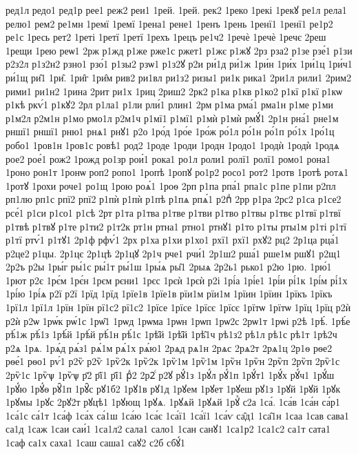 {ред1л
редо1
ред1р
рее1
реж2
реи1
1рей.
1рей.
рек2
1реко
1рекі
1рекꙋ
ре1л
рела1
релю1
рем2
ре1мн
1ремї
1ремї
1рена1
рене1
1ренъ
1рень
1ренї1
1ренї1
ре1р2
ре1с
1ресь
рет2
1реті
1ретї
1ретї
1рехъ
1рецъ
ре1ч2
1речѐ
1речѐ
1речє
2реш
1рещи
1рею
реѡ1
2рж
р1жд
р1же
рже1с
ржет1
р1жє
р1жꙋ
2рз
рза2
р1зе
рзе́1
р1зи
р2з2л
р1з2н2
рзно1
рзо́1
р1зы2
рзѡ1
р1з2ꙋ
р2и
ри́1д
ри́1ж
1ри́н
1ри́х
1ри́1ц
1ри́ч1
ри́1щ
ри̑1
1ри̑.
1ри̑г
1ри̑м
рив2
ри1вл
ри1з2
ризы1
ри1к
рика1
2ри1л
рили1
2рим2
рими1
ри1н2
1рина
2рит
ри1х
1риц
2риш2
2рк2
р1ка
р1кв
р1ко2
р1кї
р1кї
р1кѡ
р1кѣ
ркѵ́1
р1кꙋ2
2рл
р1ла1
р1ли
рли́1
рлин1
2рм
р1ма
рма́1
рма1н
р1ме
р1ми
р1м2л
р2м1н
р1мо
рмо1л
р2м1ч
р1мї1
р1мї1
р1мѝ
р1мѝ
рмꙋ́1
2р1н
рна́1
рне1м
рншї1
рншї1
рню1
рнѧ1
рнꙋ1
р2о
1ро́д
1ро́е
1ро́ж
ро́1л
ро́1н
ро́1п
ро́1х
1ро́1ц
робо1
1ров1н
1ров1с
ровѣ1
род2
1роде
1роди
1родн
1родо1
1родѝ
1родѝ
1родѧ
рое2
рое́1
рож2
1рожд
ро1зр
рои́1
рока1
ро1л
роли1
ролї1
ролї1
ромо1
рона1
1роно
рон1т
1ронѡ
роп2
ропо1
1ропѣ
1ропꙋ
ро1р2
росо1
рот2
1ротв
1ротѣ
ротѧ1
1ротꙋ
1рохи
роче1
ро1щ
1рою
роѧ́1
1роѳ
2рп
р1па
рпа́1
рпа1с
р1пе
р1пи
р2пл
рп1лю
рп1с
рпї2
рпї2
р1пѝ
р1пѝ
р1пѣ
р1пѧ
рпѧ́1
р2пⷣ
2рр
р1ра
2рс2
р1са
р1се2
рсе́1
р1си
р1со1
р1сѣ
2рт
р1та
р1тва
р1тве
р1тви
р1тво
р1твы
р1твє
р1твї
р1твї
р1твѣ
р1твꙋ
р1те
р1ти2
р1т2к
рт1н
ртна1
ртно1
ртнꙋ1
р1то
р1ты
рты1м
р1ті
р1тї
р1тї
ртѵ́1
р1тꙋ1
2р1ф
рфѵ́1
2рх
р1ха
р1хи
р1хо1
рхї1
рхї1
рхꙋ2
рц2
2р1ца
рца́1
р2це2
р1цы.
2р1цє
2р1цѣ
2р1цꙋ
2р1ч
рче1
рчи́1
2р1ш2
рша́1
рше1м
ршꙋ1
р2щ1
2р2ъ
р2ы
1ры́г
ры́1с
ры́1т
ры́1ш
1ры́ѧ
ры̑1
2рыѧ
2р2ь1
рько1
р2ю
1рю.
1рю́1
1рют
р2є
1рє́м
1рє́н
1рєм
рєни1
1рєс
1рєѝ
1рєѝ
р2і
1рі́а
1рі́е1
1рі́и
рі́1к
1рі́м
рі́1х
1рі́ю
1рі́ѧ
р2ї
р2ї
1рїд
1рїд
1рїе1в
1рїе1в
рїи1м
рїи1м
1рїин
1рїин
1рїкъ
1рїкъ
1рї1л
1рї1л
1рїн
1рїн
рї1с2
рї1с2
1рїсе
1рїсе
1рїсє
1рїсє
1рїтѡ
1рїтѡ
1рїц
1рїц
р2ѝ
р2ѝ
р2ѡ
1рѡ́к
рѡ́1с
1рѡ̑1
1рѡд
1рѡма
1рѡн
1рѡп
1рѡ2с
2рѡ1т
1рѡі
р2ѣ
1рѣ́.
1рѣ́е
рѣ́1ж
рѣ́1з
1рѣ́й
1рѣ́й
рѣ́1н
рѣ́1с
1рѣ̑й
1рѣ̑й
1рѣ̑1ч
рѣ1з2
рѣ1л
рѣ1с
рѣ1т
1рѣ2ч
р2ѧ
1рѧ.
1рѧ́д
рѧ́з1
рѧ́1м
рѧ́1х
рѧ́ю1
2рѧд
рѧ1н
2рѧс
2рѧ2т
2рѧ1ц
2р1ѳ
рѳе2
рѳе́1
рѳо1
рѵ́1
р2ѷ
р2ѷ
1рѷ2к
1рѷ2к
1рѷ1м
1рѷ1м
1рѷн
1рѷн
2рѷп
2рѷп
2рѷ1с
2рѷ1с
1рѷѱ
1рѷѱ
р҃2
р҃ї1
р҃ї1
рⷣ2
2р2ⷭ
р2ꙋ
рꙋ́1з
1рꙋ́л
рꙋ́1п
1рꙋ́т1
1рꙋ́х
рꙋ́ч1
1рꙋ́ш
1рꙋ́ю
1рꙋ́ѳ
рꙋ̑1п
1рꙋ̑с
рꙋ1б2
1рꙋ1в
рꙋ1д
1рꙋем
1рꙋет
1рꙋеш
рꙋ1з
1рꙋй
1рꙋй
1рꙋк
1рꙋмы
1рꙋс
2рꙋ2т
рꙋцѣ1
1рꙋющ
1рꙋѧ.
1рꙋѧй
1рꙋѧй
1рꙋⷯ
с2а
1са́.
1са́в
1са́н
са́р1
1са́1с
са́1т
1са́ф
1са́х
са́1ш
1са́ю
1са́є
1са́ї1
1са́ї1
1са́ѵ
са̑д1
1са̑1н
1саа
1сав
сава1
са1д
1саж
1саи
саи́1
1са1л2
сала1
сало1
1сан
санꙋ1
1са1р2
1са1с2
са1т
сата1
1саф
са1х
саха1
1саш
саша1
саꙋ2
с2б
сбꙋ́1
}
